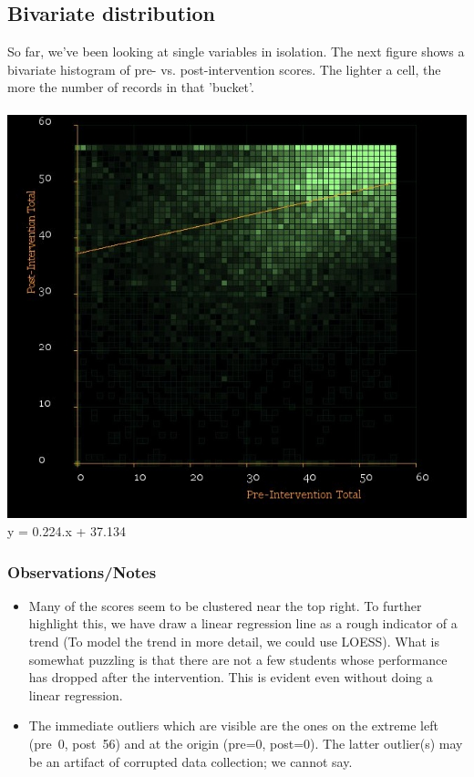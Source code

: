 \documentclass[10pt]{article}
\begin{document}
\subsection{Bivariate distribution}
So far, we've been looking at single variables in isolation. The next figure shows a bivariate histogram of pre- vs. post-intervention scores. The lighter a cell, the more the number of records in that 'bucket'.\\\\
\includegraphics[width=160mm]{ReportMedia/BivariatePrePost.jpg}
y = 0.224.x + 37.134
\subsubsection{Observations/Notes}
\begin{itemize}
\item Many of the scores seem to be clustered near the top right. To further highlight this, we have draw a linear regression line as a rough indicator of a trend (To model the trend in more detail, we could use LOESS). What is somewhat puzzling is that there are not a few students whose performance has dropped after the intervention. This is evident even without doing a linear regression.
\item The immediate outliers which are visible are the ones on the extreme left (pre~0, post~56) and at the origin (pre=0, post=0). The latter outlier(s) may be an artifact of corrupted data collection; we cannot say.
\end{itemize}
\end{document}
